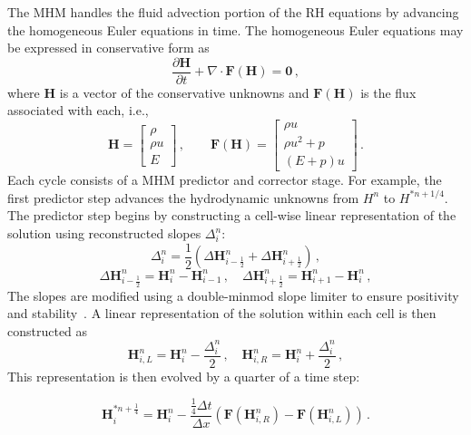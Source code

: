 \documentclass[preprint,12pt]{elsarticle}
\newcommand{\dydt}[1]{\frac{\partial #1}{\partial t}}
\newcommand{\pec}{\, ,}
\newcommand{\pep}{\, .}
\newcommand{\half}{\frac{1}{2}}
\newcommand{\fourth}{\frac{1}{4}}
\newcommand{\E}{{E_r}}
\renewcommand{\H}{\mathbf{H}}
\newcommand{\Flux}{\mathbf{F}}
\newcommand{\dt}{\Delta t}
\newcommand{\dx}{\Delta x}
\newcommand{\iL}{_{i,L}}
\newcommand{\iR}{_{i,R}}
\newcommand{\hydroPredictor}[4]{
\begin{equation}#4
  \H_i^{#2} = \H_i^{#1} - \frac{#3\dt}{\dx}
  \left(\Flux(\H\iR^{#1}) - \Flux(\H\iL^{#1})\right) \pep
\end{equation}
}
\begin{document}
The MHM handles the fluid advection portion of the RH equations by advancing the homogeneous Euler equations
in time.   The homogeneous Euler equations may be expressed in conservative form as
\begin{equation}
  \dydt{\H} + \nabla\cdot\Flux(\H) = \mathbf{0} \pec
\end{equation}
where $\H$ is a vector of the conservative unknowns
and $\Flux(\H)$ is the flux associated with each, i.e.,
\begin{equation}
  \H=\left[\begin{array}{c}\rho\\\rho u\\E\end{array}\right] \pec\qquad
  \Flux(\H)=\left[\begin{array}{c}\rho u\\
  \rho u^2 + p\\
  (E+p)u\end{array}\right] \pep
\end{equation}
Each cycle consists of a MHM predictor and corrector stage. For example, the first predictor step advances the hydrodynamic unknowns
from $H^{n}$ to $H^{*n+1/4}$.
The predictor step begins by constructing a cell-wise linear representation of the solution
using reconstructed slopes $\Delta_i^n$:
\begin{equation}\label{eq:muscl_slopes}
  \Delta_i^n = \half\left(\Delta\H_{i-\half}^n + \Delta\H_{i+\half}^n\right) \pec
\end{equation}
\begin{equation}\label{eq:muscl_differences}
  \Delta\H_{i-\half}^n = \H_i^n - \H_{i-1}^n \pec\quad
  \Delta\H_{i+\half}^n = \H_{i+1}^n - \H_i^n \pec
\end{equation}
The slopes are modified using a double-minmod slope
limiter to ensure positivity and stability~\cite{mclow2008}.
A linear representation
of the solution within each cell is then constructed as
\begin{equation}\label{eq:edge_hydro}
  \H\iL^n = \H_i^n - \frac{{\Delta}_i^n}{2} \pec
  \quad
  \H\iR^n = \H_i^n + \frac{{\Delta}_i^n}{2} \pec
\end{equation}
This representation is then evolved by a quarter of a time step:
\hydroPredictor{n}{*n+\fourth}{\fourth}{\label{eq:muscl_predictor}}
\end{document}
